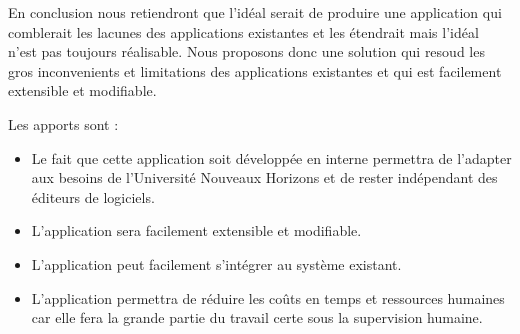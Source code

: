 En conclusion nous retiendront que l'idéal serait de produire 
une application qui comblerait les lacunes des applications existantes
et les étendrait mais l'idéal n'est pas toujours réalisable.
Nous proposons donc une solution qui resoud les gros inconvenients
et limitations des applications existantes et qui est facilement
extensible et modifiable.

Les apports sont :
\begin{itemize}
    \item Le fait que cette application soit développée en interne permettra de l'adapter aux besoins de l'Université Nouveaux Horizons et de rester indépendant des éditeurs de logiciels.
    \item L'application sera facilement extensible et modifiable.
    \item L'application peut facilement s'intégrer au système existant.
    \item L'application permettra de réduire les coûts en temps et ressources humaines car elle fera la grande partie du travail certe sous la supervision humaine.
\end{itemize}

